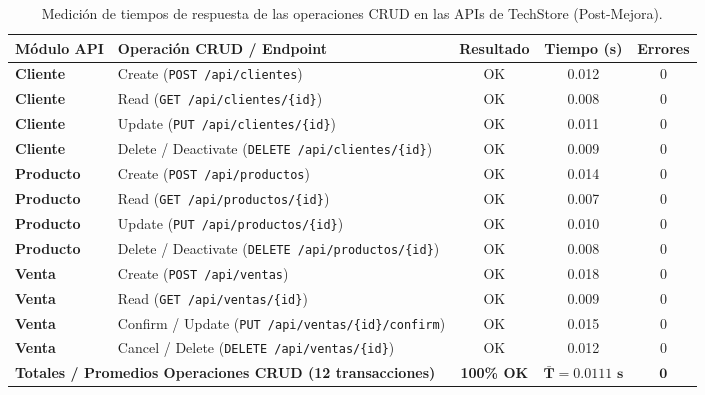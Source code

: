\documentclass{article}
\begin{document}
\begin{table}[H]
\centering
\caption{Medición de tiempos de respuesta de las operaciones CRUD en las APIs de TechStore (Post-Mejora).}
\label{tab:tiempos_crud}
\renewcommand{\arraystretch}{1.2}
\begin{tabular}{llccc}
\toprule
\textbf{Módulo API} & \textbf{Operación CRUD / Endpoint} & \textbf{Resultado} & \textbf{Tiempo (s)} & \textbf{Errores} \\
\midrule
\textbf{Cliente} & Create (\texttt{POST /api/clientes}) & OK & 0.012 & 0 \\
\textbf{Cliente} & Read (\texttt{GET /api/clientes/\{id\}}) & OK & 0.008 & 0 \\
\textbf{Cliente} & Update (\texttt{PUT /api/clientes/\{id\}}) & OK & 0.011 & 0 \\
\textbf{Cliente} & Delete / Deactivate (\texttt{DELETE /api/clientes/\{id\}}) & OK & 0.009 & 0 \\
\midrule
\textbf{Producto} & Create (\texttt{POST /api/productos}) & OK & 0.014 & 0 \\
\textbf{Producto} & Read (\texttt{GET /api/productos/\{id\}}) & OK & 0.007 & 0 \\
\textbf{Producto} & Update (\texttt{PUT /api/productos/\{id\}}) & OK & 0.010 & 0 \\
\textbf{Producto} & Delete / Deactivate (\texttt{DELETE /api/productos/\{id\}}) & OK & 0.008 & 0 \\
\midrule
\textbf{Venta} & Create (\texttt{POST /api/ventas}) & OK & 0.018 & 0 \\
\textbf{Venta} & Read (\texttt{GET /api/ventas/\{id\}}) & OK & 0.009 & 0 \\
\textbf{Venta} & Confirm / Update (\texttt{PUT /api/ventas/\{id\}/confirm}) & OK & 0.015 & 0 \\
\textbf{Venta} & Cancel / Delete (\texttt{DELETE /api/ventas/\{id\}}) & OK & 0.012 & 0 \\
\midrule
\multicolumn{2}{l}{\textbf{Totales / Promedios Operaciones CRUD (12 transacciones)}} & \textbf{100\% OK} & $\mathbf{\bar{T} = 0.0111\text{ s}}$ & $\mathbf{0}$ \\
\bottomrule
\end{tabular}
\end{table}
\end{document}
